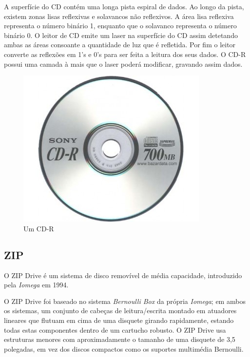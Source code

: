 \documentclass{report}
\begin{document}
	A superfície do CD contém uma longa pista espiral de dados. Ao longo da pista, existem zonas lisas reflexivas e solavancos não reflexivos. A área lisa reflexiva representa o número binário 1, enquanto que o solavanco representa o número binário 0. O leitor de CD emite um laser na superfície do CD assim detetando ambas as áreas consoante a quantidade de luz que é refletida. Por fim o leitor converte as reflexões em 1's e 0's para ser feita a leitura dos seus dados. O CD-R possui uma camada à mais que o laser poderá modificar, gravando assim dados.
\vspace{1mm}

	\begin{figure} [h]
		\centering
		\includegraphics[scale=0.4]{cd-r.jpg}
		\caption{Um CD-R}
	\end{figure}
	
\newpage	
		
		
		\subsection{ZIP}
	
	O ZIP Drive é um sistema de disco removível de média capacidade, introduzido pela \textit{Iomega} em 1994.
\vspace{1mm}

	O ZIP Drive foi baseado no sistema \textit{Bernoulli Box} da própria \textit{Iomega}; em ambos os sistemas, um conjunto de cabeças de leitura/escrita montado em atuadores lineares que flutuam em cima de uma disquete girando rapidamente, estando todas estas componentes dentro de um cartucho robusto. O ZIP Drive usa estruturas menores com aproximadamente o tamanho de uma disquete de 3,5 polegadas, em vez dos discos compactos como os suportes multimédia Bernoulli.
\vspace{1mm}
\end{document}
